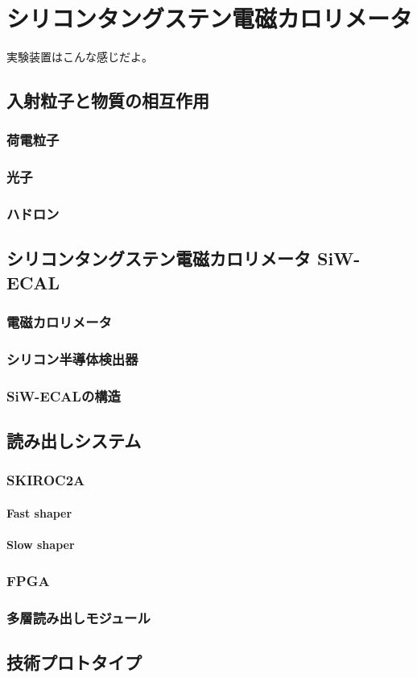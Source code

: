 
\chapter{シリコンタングステン電磁カロリメータ} \label{sec:1.Siwecal}
実験装置はこんな感じだよ。
\section{入射粒子と物質の相互作用}
\subsection{荷電粒子}
\subsection{光子}
\subsection{ハドロン}
\section{シリコンタングステン電磁カロリメータ SiW-ECAL}

\subsection{電磁カロリメータ}
\subsection{シリコン半導体検出器}
\subsection{SiW-ECALの構造}

\section{読み出しシステム}
\subsection{SKIROC2A}
\subsubsection{Fast shaper}
\subsubsection{Slow shaper}
\subsection{FPGA}
\subsection{多層読み出しモジュール}

\section{技術プロトタイプ}